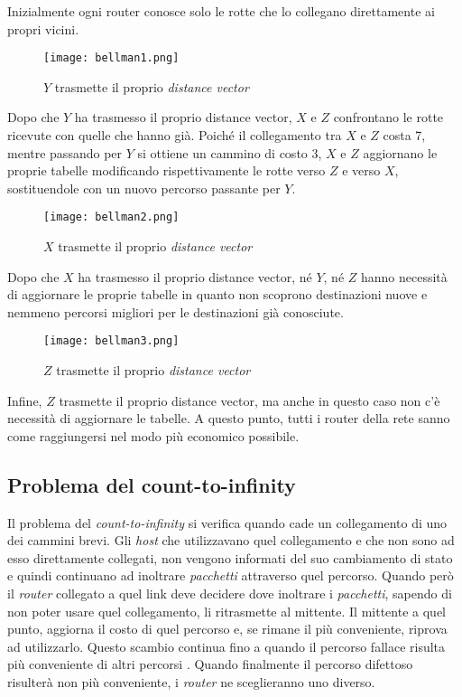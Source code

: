 \newpage
\begin{eg}
Inizialmente ogni router conosce solo le rotte che lo collegano
direttamente ai propri vicini.

\begin{figure}[h!]
    \centering
    \texttt{[image: bellman1.png]}
    \caption{$Y$ trasmette il proprio \emph{distance vector}}
\end{figure}\noindent
Dopo che $Y$ ha trasmesso il proprio distance vector, $X$ e $Z$
confrontano le rotte ricevute con quelle che hanno già. Poiché il collegamento
tra $X$ e $Z$ costa 7, mentre passando per $Y$ si ottiene un cammino di costo 3,
$X$ e $Z$ aggiornano le proprie tabelle modificando rispettivamente le rotte
verso $Z$ e verso $X$, sostituendole con un nuovo percorso passante per $Y$.

\begin{figure}[h!]
    \centering
    \texttt{[image: bellman2.png]}
    \caption{$X$ trasmette il proprio \emph{distance vector}}
\end{figure}\noindent
Dopo che $X$ ha trasmesso il proprio distance vector, né $Y$, né $Z$ hanno
necessità di aggiornare le proprie tabelle in quanto non scoprono destinazioni
nuove e nemmeno percorsi migliori per le destinazioni già conosciute.

\begin{figure}[ht!]
    \centering
    \texttt{[image: bellman3.png]}
    \caption{$Z$ trasmette il proprio \emph{distance vector}}
\end{figure}\noindent
Infine, $Z$ trasmette il proprio distance vector, ma anche in questo
caso non c'è necessità di aggiornare le tabelle. A questo punto, tutti i router
della rete sanno come raggiungersi nel modo più economico possibile.
\end{eg}

\subsection{Problema del count-to-infinity}
Il problema del \emph{count-to-infinity} si verifica quando cade un collegamento
di uno dei cammini brevi. Gli \emph{host} che utilizzavano quel collegamento e che non
sono ad esso direttamente collegati, non vengono informati del suo cambiamento
di stato e quindi continuano ad inoltrare \emph{pacchetti} attraverso quel percorso.
Quando però il \emph{router} collegato a quel link deve decidere dove inoltrare i
\emph{pacchetti}, sapendo di non poter usare quel collegamento, li ritrasmette
al mittente. Il mittente a quel punto, aggiorna il costo di quel percorso e,
se rimane il più conveniente, riprova ad utilizzarlo. Questo scambio continua
fino a quando il percorso fallace risulta più conveniente di altri
percorsi . Quando finalmente il percorso difettoso risulterà non
più conveniente, i \emph{router} ne sceglieranno uno diverso.

